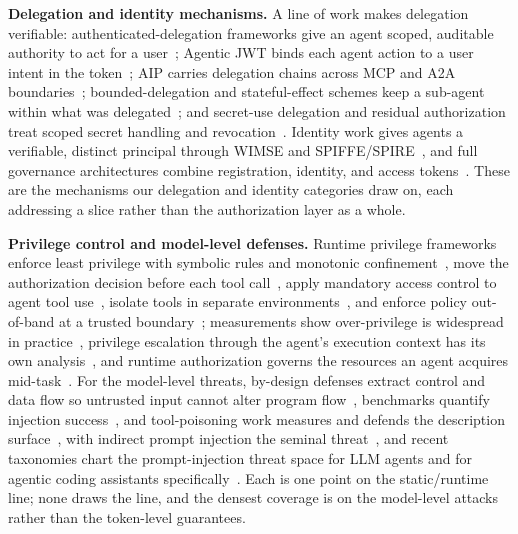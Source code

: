\noindent\textbf{Delegation and identity mechanisms.} A line of work makes delegation
verifiable: authenticated-delegation frameworks give an agent scoped, auditable
authority to act for a user~\cite{agentauth2025authdelegation}; Agentic JWT binds each
agent action to a user intent in the token~\cite{agentauth2025agenticjwt}; AIP carries
delegation chains across MCP and A2A boundaries~\cite{agentauth2026aip}; bounded-delegation and stateful-effect schemes
keep a sub-agent within what was delegated~\cite{agentauth2026boundedagents,agentauth2026aidguard};
and secret-use delegation and residual authorization treat scoped secret handling and
revocation~\cite{agentauth2026sudp,agentauth2026residualauth}. Identity work gives
agents a verifiable, distinct principal through WIMSE and
SPIFFE/SPIRE~\cite{agentauth2026aiidentity,agentauth2026ehv,agentauth2026ldp}, and
full governance architectures combine registration, identity, and access
tokens~\cite{agentauth2025saga}. These are the mechanisms our delegation and identity
categories draw on, each addressing a slice rather than the authorization layer as a
whole.

\noindent\textbf{Privilege control and model-level defenses.} Runtime privilege
frameworks enforce least privilege with symbolic rules and monotonic
confinement~\cite{agentauth2025progent}, move the authorization decision before each
tool call~\cite{agentauth2026preaction}, apply mandatory access control to agent tool
use~\cite{agentauth2026mac}, isolate tools in separate
environments~\cite{agentauth2024isolategpt}, and enforce policy out-of-band at a
trusted boundary~\cite{agentauth2026angels}; measurements show over-privilege is
widespread in practice~\cite{agentauth2025privmgmtmcp}, privilege escalation through
the agent's execution context has its own analysis~\cite{agentauth2026contextroot},
and runtime authorization governs the resources an agent acquires
mid-task~\cite{agentauth2026runtimeauthz}. For the model-level threats,
by-design defenses extract control and data flow so untrusted input cannot alter
program flow~\cite{agentauth2025camel}, benchmarks quantify injection
success~\cite{agentauth2024agentdojo}, and tool-poisoning work measures and defends
the description surface~\cite{agentauth2025mcptox,agentauth2026trustdesc,agentauth2026noboxmcp,agentauth2026unicodetag},
with indirect prompt injection the seminal threat~\cite{agentauth2023indirectpi}, and
recent taxonomies chart the prompt-injection threat space for LLM agents and for
agentic coding assistants
specifically~\cite{agentauth2026pitaxonomy,agentauth2026codingassistants}. Each
is one point on the static/runtime line; none draws the line, and the densest coverage
is on the model-level attacks rather than the token-level guarantees.

